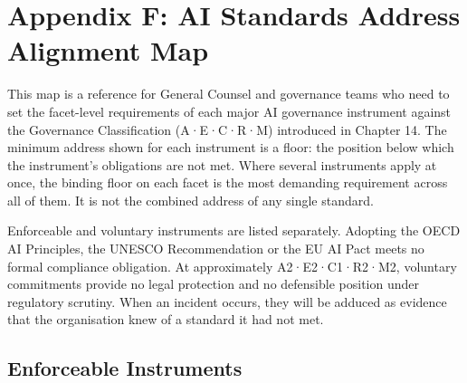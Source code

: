 
\chapter*{Appendix F: AI Standards Address Alignment Map}

This map is a reference for General Counsel and governance teams who need to set the facet-level requirements of each major AI governance instrument against the Governance Classification (A·E·C·R·M) introduced in Chapter 14. The minimum address shown for each instrument is a floor: the position below which the instrument's obligations are not met. Where several instruments apply at once, the binding floor on each facet is the most demanding requirement across all of them. It is not the combined address of any single standard.

Enforceable and voluntary instruments are listed separately. Adopting the OECD AI Principles, the UNESCO Recommendation or the EU AI Pact meets no formal compliance obligation. At approximately A2·E2·C1·R2·M2, voluntary commitments provide no legal protection and no defensible position under regulatory scrutiny. When an incident occurs, they will be adduced as evidence that the organisation knew of a standard it had not met.

\section{Enforceable Instruments}

